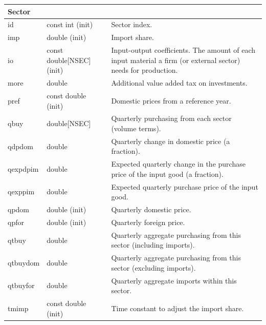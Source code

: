 \documentclass{article}
\begin{document}
\begin{longtable}{p{}p{}p{}}
\multicolumn{3}{l}{\textbf{Sector}} \\
\midrule
id & const int (init) & Sector index.\\
imp & double (init) & Import share.\\
io & const double[NSEC] (init) & Input-output coefficients. The amount of each input material a firm (or external sector) needs for production.\\
more & double & Additional value added tax on investments.\\
pref & const double (init) & Domestic prices from a reference year.\\
qbuy & double[NSEC] & Quarterly purchasing from each sector (volume terms).\\
qdpdom & double & Quarterly change in domestic price (a fraction).\\
qexpdpim & double & Expected quarterly change in the purchase price of the input good (a fraction).\\
qexppim & double & Expected quarterly purchase price of the input good.\\
qpdom & double (init) & Quarterly domestic price.\\
qpfor & double (init) & Quarterly foreign price.\\
qtbuy & double & Quarterly aggregate purchasing from this sector (including imports).\\
qtbuydom & double & Quarterly aggregate purchasing from this sector (excluding imports).\\
qtbuyfor & double & Quarterly aggregate imports within this sector.\\
tmimp & const double (init) & Time constant to adjust the import share.\\
\midrule


\end{longtable}
\end{document}
